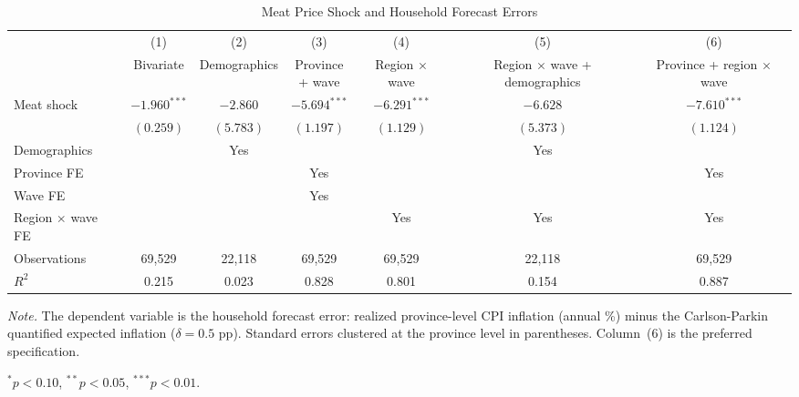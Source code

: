 \begin{table}[!htbp]
\centering
\caption{Meat Price Shock and Household Forecast Errors}
\label{tab:eq3_forecast_error}
\begin{threeparttable}
\footnotesize
\setlength{\tabcolsep}{3pt}
\begin{tabular}{lcccccc}
\toprule
& (1) & (2) & (3) & (4) & (5) & (6) \\
& Bivariate & Demographics & \shortstack{Province\\+ wave} & \shortstack{Region\\$\times$ wave} & \shortstack{Region $\times$ wave\\+ demographics} & \shortstack{Province +\\region $\times$ wave} \\
\midrule
Meat shock & $-1.960^{***}$ & $-2.860$ & $-5.694^{***}$ & $-6.291^{***}$ & $-6.628$ & $-7.610^{***}$ \\
& $(0.259)$ & $(5.783)$ & $(1.197)$ & $(1.129)$ & $(5.373)$ & $(1.124)$ \\[6pt]
Demographics &  & Yes &  &  & Yes &  \\
Province FE &  &  & Yes &  &  & Yes \\
Wave FE &  &  & Yes &  &  &  \\
Region $\times$ wave FE &  &  &  & Yes & Yes & Yes \\
\midrule
Observations & 69,529 & 22,118 & 69,529 & 69,529 & 22,118 & 69,529 \\
$R^2$ & 0.215 & 0.023 & 0.828 & 0.801 & 0.154 & 0.887 \\
\bottomrule
\end{tabular}
\begin{tablenotes}[flushleft]
\footnotesize
\item \textit{Note.} The dependent variable is the household forecast error: realized province-level CPI inflation (annual \%) minus the Carlson-Parkin quantified expected inflation ($\delta = 0.5$ pp). Standard errors clustered at the province level in parentheses. Column~(6) is the preferred specification.
\item $^{*}p<0.10$, $^{**}p<0.05$, $^{***}p<0.01$.
\end{tablenotes}
\end{threeparttable}
\end{table}
